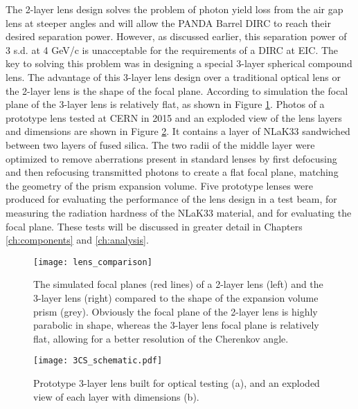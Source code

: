 The 2-layer lens design solves the problem of photon yield loss from the air gap lens at steeper angles and will allow the PANDA Barrel DIRC to reach their desired separation power. However, as discussed earlier, this separation power of 3 s.d. at 4 GeV/c is unacceptable for the requirements of a DIRC at EIC. The key to solving this problem was in designing a special 3-layer spherical compound lens. The advantage of this 3-layer lens design over a traditional optical lens or the 2-layer lens is the shape of the focal plane. According to simulation the focal plane of the 3-layer lens is relatively flat, as shown in Figure \ref{fig:lens_focal_plane}. Photos of a prototype lens tested at CERN in 2015 and an exploded view of the lens layers and dimensions are shown in Figure \ref{fig:3CS_schematic}. It contains a layer of NLaK33 sandwiched between two layers of fused silica. The two radii of the middle layer were optimized to remove aberrations present in standard lenses by first defocusing and then refocusing transmitted photons to create a flat focal plane, matching the geometry of the prism expansion volume. Five prototype lenses were produced for evaluating the performance of the lens design in a test beam, for measuring the radiation hardness of the NLaK33 material, and for evaluating the focal plane. These tests will be discussed in greater detail in Chapters \ref{ch:components} and \ref{ch:analysis}.

\begin{figure}[!htb]
	\centering
	\texttt{[image: lens\_comparison]}
	\caption{The simulated focal planes (red lines) of a 2-layer lens (left) and the 3-layer lens (right) compared to the shape of the expansion volume prism (grey). Obviously the focal plane of the 2-layer lens is highly parabolic in shape, whereas the 3-layer lens focal plane is relatively flat, allowing for a better resolution of the Cherenkov angle.}
	\label{fig:lens_focal_plane}
\end{figure}

\begin{figure}[!htb]
	\centering
	\texttt{[image: 3CS\_schematic.pdf]}
	\caption{Prototype 3-layer lens built for optical testing (a), and an exploded view of each layer with dimensions (b).}
	\label{fig:3CS_schematic}
\end{figure}


